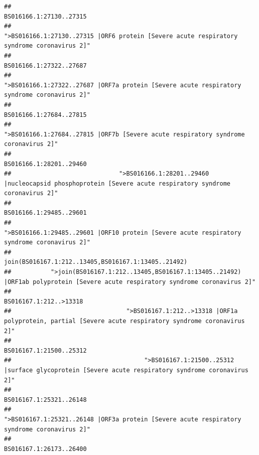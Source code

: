 \documentclass[
]{article}
\begin{document}
\begin{verbatim}
##                                                                                                                BS016166.1:27130..27315 
##                                             ">BS016166.1:27130..27315 |ORF6 protein [Severe acute respiratory syndrome coronavirus 2]" 
##                                                                                                                BS016166.1:27322..27687 
##                                            ">BS016166.1:27322..27687 |ORF7a protein [Severe acute respiratory syndrome coronavirus 2]" 
##                                                                                                                BS016166.1:27684..27815 
##                                                    ">BS016166.1:27684..27815 |ORF7b [Severe acute respiratory syndrome coronavirus 2]" 
##                                                                                                                BS016166.1:28201..29460 
##                              ">BS016166.1:28201..29460 |nucleocapsid phosphoprotein [Severe acute respiratory syndrome coronavirus 2]" 
##                                                                                                                BS016166.1:29485..29601 
##                                            ">BS016166.1:29485..29601 |ORF10 protein [Severe acute respiratory syndrome coronavirus 2]" 
##                                                                                    join(BS016167.1:212..13405,BS016167.1:13405..21492) 
##           ">join(BS016167.1:212..13405,BS016167.1:13405..21492) |ORF1ab polyprotein [Severe acute respiratory syndrome coronavirus 2]" 
##                                                                                                                 BS016167.1:212..>13318 
##                                ">BS016167.1:212..>13318 |ORF1a polyprotein, partial [Severe acute respiratory syndrome coronavirus 2]" 
##                                                                                                                BS016167.1:21500..25312 
##                                     ">BS016167.1:21500..25312 |surface glycoprotein [Severe acute respiratory syndrome coronavirus 2]" 
##                                                                                                                BS016167.1:25321..26148 
##                                            ">BS016167.1:25321..26148 |ORF3a protein [Severe acute respiratory syndrome coronavirus 2]" 
##                                                                                                                BS016167.1:26173..26400 

\end{verbatim}
\end{document}
